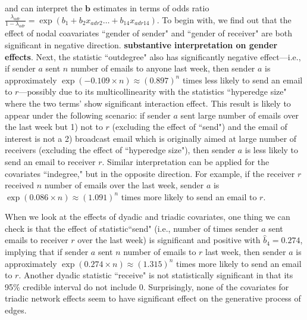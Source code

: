 \documentclass[ba]{imsart}
\numberwithin{equation}{section}
\theoremstyle{plain}
\begin{document}
	and can interpret the $\boldsymbol{b}$ estimates in terms of odds ratio $\frac{\lambda_{adr}}{1-\lambda_{adr}}=\exp(b_{1}+b_{2} x_{adr2}\ldots+b_{14}x_{adr14})$.
	To begin with, we find out that the effect of nodal coavariates ``gender of sender" and ``gender of receiver" are both significant in negative direction. \textbf{substantive interpretation on gender effects}. Next, the statistic ``outdegree" also has significantly negative effect---i.e., if sender $a$ sent $n$ number of emails to anyone last week, then sender $a$ is approximately $\exp(-0.109\times n)\approx(0.897)^n$ times less likely to send an email to $r$---possibly due to its multicollinearity with the statistics ``hyperedge size" where the two terms' show significant interaction effect. This result is likely to appear under the following scenario: if sender $a$ sent large number of emails over the last week but 1) not to $r$ (excluding the effect of ``send") and the email of interest is not a  2) broadcast email which is originally aimed at large number of receivers (excluding the effect of ``hyperedge size"), then sender $a$ is less likely to send an email to receiver $r$. Similar interpretation can be applied for the covariates ``indegree," but in the opposite direction. For example, if the receiver $r$ received $n$ number of emails over the last week, sender $a$ is $\exp(0.086\times n)\approx(1.091)^n $ times more likely to send an email to $r$. 

	When we look at the effects of dyadic and triadic covariates, one thing we can check is that the effect of statistic``send" (i.e., number of times sender $a$ sent emails to receiver $r$ over the last week) is significant and positive with $\hat{b}_4 = 0.274$, implying that if sender $a$ sent $n$ number of emails to $r$ last week, then sender $a$ is approximately $\exp(0.274\times n)\approx(1.315)^n$ times more likely to send an email to $r$. Another dyadic statistic ``receive" is not statistically significant in that its 95\% credible interval do not include 0. Surprisingly, none of the covariates for triadic network effects seem to have significant effect on the generative process of edges.
\end{document}
